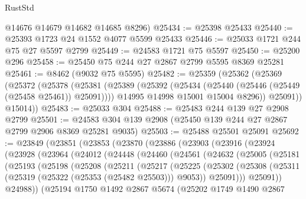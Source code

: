 \begin{lexlean}{RustStd}
\begin{coremodule}
      @14676
      @14679
      @14682
      @14685
      @8296)
@25434 := @25398 @25433
@25440 := @25393 @1723 @24 @1552 @4077 @5599 @25433
@25446 := @25033 @1721 @244 @75 @27 @5597 @2799
@25449 := @24583 @1721 @75 @5597
@25450 := @25200 @296
@25458 := @25450 @75 @244 @27 @2867 @2799 @5595 @8369 @25281
@25461 := @8462 (@9032 @75 @5595)
@25482 := @25359
    (@25362
      (@25369
        (@25372
          (@25378
            (@25381
              (@25389
                (@25392 (@25434 (@25440 (@25446 (@25449 (@25458 @25461)) @25091))))
                @14995
                @14998
                @15001
                @15004
                @8296))
            @25091))
        @15014))
@25483 := @25033 @304
@25488 := @25483 @244 @139 @27 @2908 @2799
@25501 := @24583 @304 @139 @2908 (@25450 @139 @244 @27 @2867 @2799 @2906 @8369 @25281 @9035)
@25503 := @25488 @25501 @25091
@25692 := @23849
    (@23851
      (@23853
        (@23870
          (@23886
            (@23903
              (@23916
                (@23924
                  (@23928
                    (@23964
                      (@24012
                        (@24448
                          (@24460
                            (@24561
                              (@24632
                                (@25005
                                  (@25181
                                    (@25193
                                      (@25198
                                        (@25208
                                          (@25211
                                            (@25217
                                              (@25225
                                                (@25302
                                                  (@25308
                                                    (@25311
                                                      (@25319
                                                        (@25322 (@25353 (@25482 @25503)))
                                                        @9053))
                                                    @25091)))
                                              @25091))
                                          @24988))
                                      (@25194
                                        @1750
                                        @1492
                                        @2867
                                        @5674
                                        (@25202
                                          @1749
                                          @1490
                                          @2867

\end{coremodule}
\end{lexlean}
